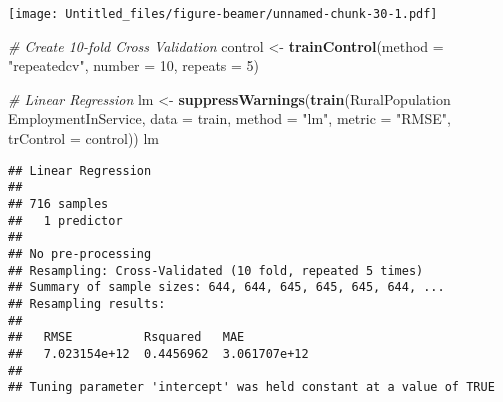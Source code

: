 \documentclass[ignorenonframetext,]{beamer}
\newenvironment{Shaded}{\begin{snugshade}}{\end{snugshade}}
\newcommand{\CommentTok}[1]{\textcolor[rgb]{0.56,0.35,0.01}{\textit{#1}}}
\newcommand{\DataTypeTok}[1]{\textcolor[rgb]{0.13,0.29,0.53}{#1}}
\newcommand{\DecValTok}[1]{\textcolor[rgb]{0.00,0.00,0.81}{#1}}
\newcommand{\KeywordTok}[1]{\textcolor[rgb]{0.13,0.29,0.53}{\textbf{#1}}}
\newcommand{\NormalTok}[1]{#1}
\newcommand{\OperatorTok}[1]{\textcolor[rgb]{0.81,0.36,0.00}{\textbf{#1}}}
\newcommand{\OtherTok}[1]{\textcolor[rgb]{0.56,0.35,0.01}{#1}}
\newcommand{\StringTok}[1]{\textcolor[rgb]{0.31,0.60,0.02}{#1}}
\begin{document}
\begin{frame}[fragile]
\begin{Shaded}
\end{Shaded}

\texttt{[image: Untitled\_files/figure-beamer/unnamed-chunk-30-1.pdf]}

\begin{Shaded}
\begin{Highlighting}[]
\CommentTok{# Create 10-fold Cross Validation}
\NormalTok{control <-}\StringTok{ }\KeywordTok{trainControl}\NormalTok{(}\DataTypeTok{method =} \StringTok{"repeatedcv"}\NormalTok{,}
                        \DataTypeTok{number =} \DecValTok{10}\NormalTok{,}
                        \DataTypeTok{repeats =} \DecValTok{5}\NormalTok{)}
\end{Highlighting}
\end{Shaded}

\begin{Shaded}
\begin{Highlighting}[]
\CommentTok{# Linear Regression}
\NormalTok{lm <-}\StringTok{ }\KeywordTok{suppressWarnings}\NormalTok{(}\KeywordTok{train}\NormalTok{(RuralPopulation }\OperatorTok{~}\StringTok{ }\NormalTok{EmploymentInService, }\DataTypeTok{data =}\NormalTok{ train, }\DataTypeTok{method =} \StringTok{"lm"}\NormalTok{,}
                             \DataTypeTok{metric =} \StringTok{"RMSE"}\NormalTok{, }\DataTypeTok{trControl =}\NormalTok{ control))}
\NormalTok{lm}
\end{Highlighting}
\end{Shaded}

\begin{verbatim}
## Linear Regression 
## 
## 716 samples
##   1 predictor
## 
## No pre-processing
## Resampling: Cross-Validated (10 fold, repeated 5 times) 
## Summary of sample sizes: 644, 644, 645, 645, 645, 644, ... 
## Resampling results:
## 
##   RMSE          Rsquared   MAE         
##   7.023154e+12  0.4456962  3.061707e+12
## 
## Tuning parameter 'intercept' was held constant at a value of TRUE
\end{verbatim}


\end{frame}
\end{document}
